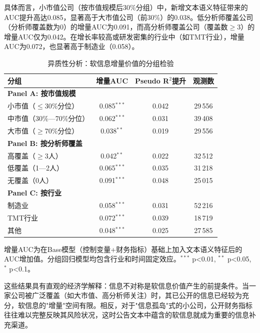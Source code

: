 具体而言，小市值公司（按市值规模后30\%分组）中，新增文本语义特征带来的AUC提升高达0.085，显著高于大市值公司（前30\%）的0.038。低分析师覆盖公司（分析师覆盖数为0）的增量AUC为0.091，而高分析师覆盖公司（覆盖数$\ge$3）的增量AUC仅为0.042。在增长率较高或研发密集的行业中（如TMT行业），增量AUC为0.072，也显著高于制造业（0.058）。

\begin{table}[H]
\centering
\caption{异质性分析：软信息增量价值的分组检验}
\label{tab:heterogeneity}
\begin{threeparttable}
\begin{tabular}{lccc}
\toprule
分组 & 增量AUC & Pseudo R$^2$提升 & 观测数 \\
\midrule
\textbf{Panel A: 按市值规模} & & & \\
小市值（$\le$30\%分位） & 0.085$^{***}$ & 0.042 & 29\,556 \\
中市值（30\%—70\%分位） & 0.062$^{***}$ & 0.031 & 39\,408 \\
大市值（$\ge$70\%分位） & 0.038$^{**}$ & 0.019 & 29\,556 \\
\midrule
\textbf{Panel B: 按分析师覆盖} & & & \\
高覆盖（$\ge$3人） & 0.042$^{**}$ & 0.022 & 32\,512 \\
低覆盖（1—2人） & 0.065$^{***}$ & 0.035 & 31\,218 \\
无覆盖（0人） & 0.091$^{***}$ & 0.048 & 25\,015 \\
\midrule
\textbf{Panel C: 按行业} & & & \\
制造业 & 0.058$^{***}$ & 0.031 & 52\,216 \\
TMT行业 & 0.072$^{***}$ & 0.039 & 18\,719 \\
其他 & 0.048$^{***}$ & 0.025 & 27\,585 \\
\bottomrule
\end{tabular}
\begin{tablenotes}
\item[注] 增量AUC为在Base模型（控制变量+财务指标）基础上加入文本语义特征后的AUC增加值。分组回归模型均包含行业和时间固定效应。$^{***}$ p<0.01, $^{**}$ p<0.05, $^{*}$ p<0.1。
\end{tablenotes}
\end{threeparttable}
\end{table}

这些结果具有直观的经济学解释：信息不对称是软信息价值产生的前提条件。当一家公司被广泛覆盖（如大市值、高分析师关注）时，其已公开的信息已经较为充分，软信息的"增量"空间有限。相反，对于"信息孤岛"式的小公司，公开财务指标往往难以完整反映其风险状况，这时公告文本中蕴含的软信息就成为重要的信息补充渠道。